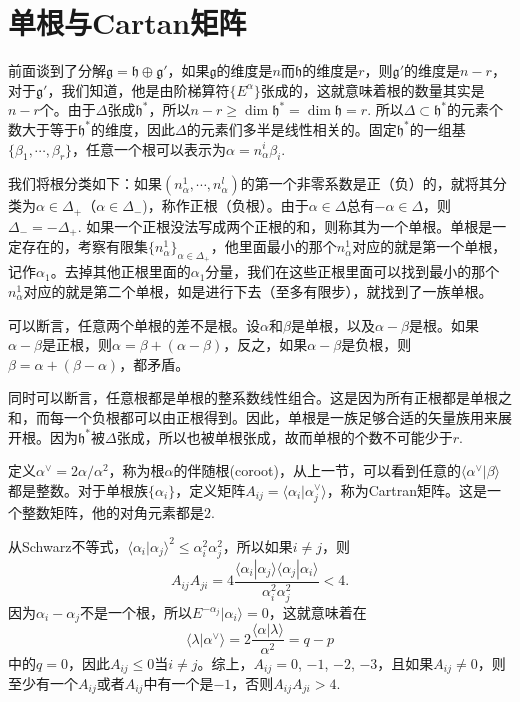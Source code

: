 \documentclass[9pt]{extarticle}
\newcommand{\lag}{{\mathfrak{g}}}
\begin{document}
\section{单根与Cartan矩阵}

\para 前面谈到了分解$\lag=\mathfrak{h}\oplus \lag'$，如果$\lag$的维度是$n$而$\mathfrak{h}$的维度是$r$，则$\lag'$的维度是$n-r$，对于$\lag'$，我们知道，他是由阶梯算符$\{E^\alpha\}$张成的，这就意味着根的数量其实是$n-r$个。由于$\Delta$张成$\mathfrak{h}^*$，所以$n-r\geq\dim \mathfrak{h}^*=\dim \mathfrak{h}=r$. 所以$\Delta\subset \mathfrak{h}^*$的元素个数大于等于$\mathfrak{h}^*$的维度，因此$\Delta$的元素们多半是线性相关的。固定$\mathfrak{h}^*$的一组基$\{\beta_1,\cdots,\beta_r\}$，任意一个根可以表示为$\alpha=n^i_\alpha\beta_i$.

我们将根分类如下：如果$(n^1_\alpha,\cdots,n^l_\alpha)$的第一个非零系数是正（负）的，就将其分类为$\alpha\in \Delta_+$（$\alpha\in \Delta_-$)，称作正根（负根）。由于$\alpha\in \Delta$总有$-\alpha\in \Delta$，则$\Delta_-=-\Delta_+$. 如果一个正根没法写成两个正根的和，则称其为一个单根。单根是一定存在的，考察有限集$\{n^1_\alpha\}_{\alpha\in \Delta_+}$，他里面最小的那个$n^1_\alpha$对应的就是第一个单根，记作$\alpha_1$。去掉其他正根里面的$\alpha_1$分量，我们在这些正根里面可以找到最小的那个$n^1_\alpha$对应的就是第二个单根，如是进行下去（至多有限步），就找到了一族单根。

\para 可以断言，任意两个单根的差不是根。设$\alpha$和$\beta$是单根，以及$\alpha-\beta$是根。如果$\alpha-\beta$是正根，则$\alpha=\beta+(\alpha-\beta)$，反之，如果$\alpha-\beta$是负根，则$\beta=\alpha+(\beta-\alpha)$，都矛盾。

同时可以断言，任意根都是单根的整系数线性组合。这是因为所有正根都是单根之和，而每一个负根都可以由正根得到。因此，单根是一族足够合适的矢量族用来展开根。因为$\mathfrak{h}^*$被$\Delta$张成，所以也被单根张成，故而单根的个数不可能少于$r$. 

\para 定义$\alpha^\vee=2\alpha/\alpha^2$，称为根$\alpha$的伴随根(coroot)，从上一节，可以看到任意的$\langle \alpha^\vee|\beta\rangle$都是整数。对于单根族$\{\alpha_i\}$，定义矩阵$A_{ij}=\langle \alpha_i|\alpha^\vee_j\rangle$，称为Cartran矩阵。这是一个整数矩阵，他的对角元素都是$2$.

从Schwarz不等式，$\langle \alpha_i|\alpha_j\rangle^2\leq \alpha_i^2\alpha_j^2$，所以如果$i\neq j$，则
\[
	A_{ij}A_{ji}=4\frac{\langle \alpha_i|\alpha_j\rangle\langle \alpha_j|\alpha_i\rangle}{\alpha_i^2\alpha_j^2}<4.
\]
因为$\alpha_i-\alpha_j$不是一个根，所以$E^{-\alpha_j}|\alpha_i\rangle =0$，这就意味着在
\[
	\langle \lambda|\alpha^\vee\rangle =2\frac{\langle\alpha|\lambda\rangle}{\alpha^2}=q-p
\]
中的$q=0$，因此$A_{ij}\leq 0$当$i\neq j$。综上，$A_{ij}=0$, $-1$, $-2$, $-3$，且如果$A_{ij}\neq 0$，则至少有一个$A_{ij}$或者$A_{ij}$中有一个是$-1$，否则$A_{ij}A_{ji}>4$.
\end{document}
